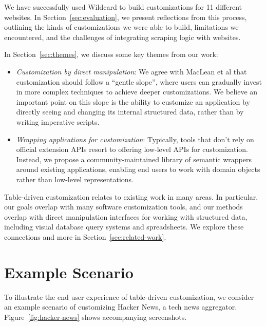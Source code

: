 \documentclass[sigplan,screen,10pt,anonymous,review]{acmart}
\providecommand{\tightlist}{%
  \setlength{\itemsep}{0pt}\setlength{\parskip}{0pt}}
\begin{document}
We have successfully used Wildcard to build customizations for 11
different websites. In Section~\ref{sec:evaluation}, we present
reflections from this process, outlining the kinds of customizations we
were able to build, limitations we encountered, and the challenges of
integrating scraping logic with websites.

In Section~\ref{sec:themes}, we discuss some key themes from our work:

\begin{itemize}
\tightlist
\item
  \emph{Customization by direct manipulation}: We agree with MacLean et
  al \citep{maclean1990} that customization should follow a ``gentle
  slope'', where users can gradually invest in more complex techniques
  to achieve deeper customizations. We believe an important point on
  this slope is the ability to customize an application by directly
  seeing and changing its internal structured data, rather than by
  writing imperative scripts.
\item
  \emph{Wrapping applications for customization}: Typically, tools that
  don't rely on official extension APIs resort to offering low-level
  APIs for customization. Instead, we propose a community-maintained
  library of semantic wrappers around existing applications, enabling
  end users to work with domain objects rather than low-level
  representations.
\end{itemize}

Table-driven customization relates to existing work in many areas. In
particular, our goals overlap with many software customization tools,
and our methods overlap with direct manipulation interfaces for working
with structured data, including visual database query systems and
spreadsheets. We explore these connections and more in
Section~\ref{sec:related-work}.

\hypertarget{sec:example}{%
\section{Example Scenario}\label{sec:example}}

To illustrate the end user experience of table-driven customization, we
consider an example scenario of customizing Hacker News, a tech news
aggregator. Figure~\ref{fig:hacker-news} shows accompanying screenshots.
\end{document}
